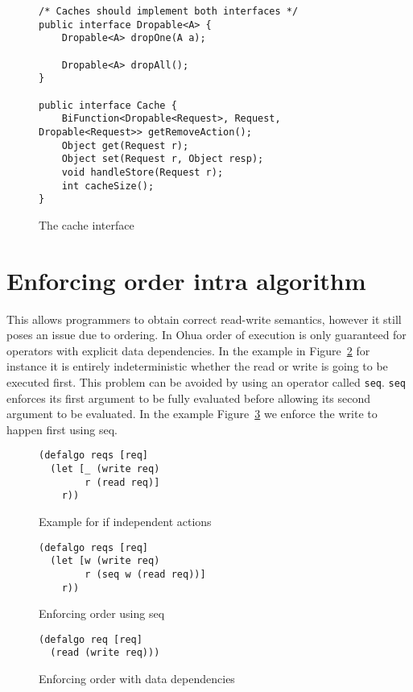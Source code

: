 \begin{figure}
\begin{verbatim}
/* Caches should implement both interfaces */
public interface Dropable<A> {
    Dropable<A> dropOne(A a);

    Dropable<A> dropAll();
}

public interface Cache {
    BiFunction<Dropable<Request>, Request, Dropable<Request>> getRemoveAction();
    Object get(Request r);
    Object set(Request r, Object resp);
    void handleStore(Request r);
    int cacheSize();
}
\end{verbatim}
\caption{The cache interface}
\label{fig:the-cache-interface}
\end{figure}

\section{Enforcing order intra algorithm}

This allows programmers to obtain correct read-write semantics, however it still poses an issue due to ordering.
In Ohua order of execution is only guaranteed for operators with explicit data dependencies.
In the example in Figure~\ref{fig:independent-actions-code} for instance it is entirely indeterministic whether the read or write is going to be executed first.
This problem can be avoided by using an operator called \texttt{seq}.
\texttt{seq} enforces its first argument to be fully evaluated before allowing its second argument to be evaluated.
In the example Figure~\ref{fig:enforcing-order-with-seq} we enforce the write to happen first using seq.

\begin{figure}
\begin{verbatim}
(defalgo reqs [req]
  (let [_ (write req)
        r (read req)]
    r))
\end{verbatim}
\caption{Example for if independent actions}
\label{fig:independent-actions-code}
\end{figure}

\begin{figure}
\begin{verbatim}
(defalgo reqs [req]
  (let [w (write req)
        r (seq w (read req))]
    r))
\end{verbatim}
\caption{Enforcing order using seq}
\label{fig:enforcing-order-with-seq}
\end{figure}

\begin{figure}
\begin{verbatim}
(defalgo req [req]
  (read (write req)))
\end{verbatim}
\caption{Enforcing order with data dependencies}
\label{fig:enforcing-order-with-dd}
\end{figure}

